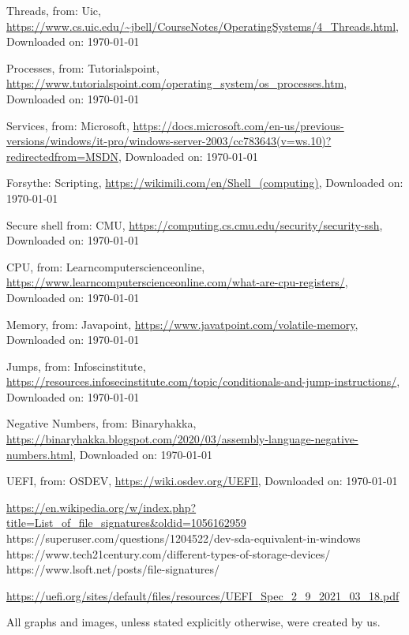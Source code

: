 \begin{thebibliography}{10}
	Threads, from: Uic,
	\url{https://www.cs.uic.edu/~jbell/CourseNotes/OperatingSystems/4_Threads.html},
	Downloaded on: \today

	Processes, from: Tutorialspoint,
	\url{https://www.tutorialspoint.com/operating_system/os_processes.htm},
	Downloaded on: \today

	Services, from: Microsoft,
	\url{https://docs.microsoft.com/en-us/previous-versions/windows/it-pro/windows-server-2003/cc783643(v=ws.10)?redirectedfrom=MSDN},
	Downloaded on: \today

	Forsythe: Scripting,
	\url{https://wikimili.com/en/Shell_(computing)},
	Downloaded on: \today

	Secure shell from: CMU,
	\url{https://computing.cs.cmu.edu/security/security-ssh},
	Downloaded on: \today

	CPU, from: Learncomputerscienceonline,
	\url{https://www.learncomputerscienceonline.com/what-are-cpu-registers/},
	Downloaded on: \today

	Memory, from: Javapoint,
	\url{https://www.javatpoint.com/volatile-memory},
	Downloaded on: \today

	Jumps, from: Infoscinstitute,
	\url{https://resources.infosecinstitute.com/topic/conditionals-and-jump-instructions/},
	Downloaded on: \today

	Negative Numbers, from: Binaryhakka,
	\url{https://binaryhakka.blogspot.com/2020/03/assembly-language-negative-numbers.html},
	Downloaded on: \today

	UEFI, from: OSDEV,
	\url{https://wiki.osdev.org/UEFIl},
	Downloaded on: \today

\end{thebibliography}


\url{https://en.wikipedia.org/w/index.php?title=List\_of\_file\_signatures&oldid=1056162959}
https://superuser.com/questions/1204522/dev-sda-equivalent-in-windows
https://www.tech21century.com/different-types-of-storage-devices/
https://www.lsoft.net/posts/file-signatures/

\url{https://uefi.org/sites/default/files/resources/UEFI\_Spec\_2\_9\_2021\_03\_18.pdf}

%
All graphs and images, unless stated explicitly otherwise, were created by us. 
